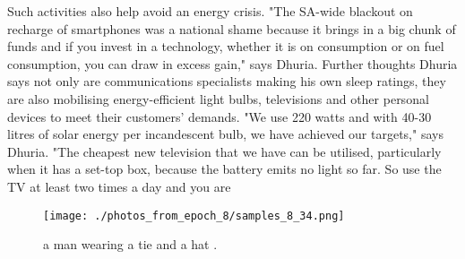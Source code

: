 \documentclass{article}%
\begin{document}
Such activities also help avoid an energy crisis. "The SA{-}wide blackout on recharge of smartphones was a national shame because it brings in a big chunk of funds and if you invest in a technology, whether it is on consumption or on fuel consumption, you can draw in excess gain," says Dhuria.\newline%
Further thoughts\newline%
Dhuria says not only are communications specialists making his own sleep ratings, they are also mobilising energy{-}efficient light bulbs, televisions and other personal devices to meet their customers' demands.\newline%
"We use 220 watts and with 40{-}30 litres of solar energy per incandescent bulb, we have achieved our targets," says Dhuria. "The cheapest new television that we have can be utilised, particularly when it has a set{-}top box, because the battery emits no light so far. So use the TV at least two times a day and you are

%


\begin{figure}[h!]%
\centering%
\texttt{[image: ./photos\_from\_epoch\_8/samples\_8\_34.png]}%
\caption{a man wearing a tie and a hat .}%
\end{figure}

%
\end{document}
